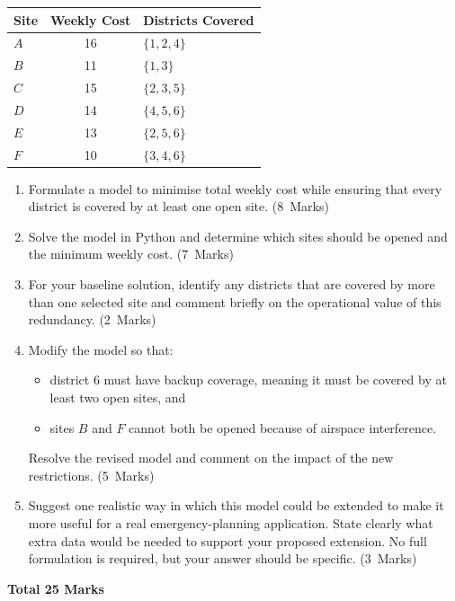 \documentclass[11pt,a4paper]{article}
\newcommand{\markalloc}[1]{\nobreak\hfill\mbox{(#1 Marks)}}
\newcommand{\questiontotal}[1]{\begin{flushright}\textbf{Total #1 Marks}\end{flushright}}
\begin{document}
\begin{center}
\begin{tabular}{lcl}
\toprule
Site & Weekly Cost & Districts Covered \\
\midrule
$A$ & 16 & $\{1,2,4\}$ \\
$B$ & 11 & $\{1,3\}$ \\
$C$ & 15 & $\{2,3,5\}$ \\
$D$ & 14 & $\{4,5,6\}$ \\
$E$ & 13 & $\{2,5,6\}$ \\
$F$ & 10 & $\{3,4,6\}$ \\
\bottomrule
\end{tabular}
\end{center}

\begin{enumerate}
\item Formulate a model to minimise total weekly cost while ensuring that every district is covered by at least one open site. \markalloc{8}

\item Solve the model in Python and determine which sites should be opened and the minimum weekly cost. \markalloc{7}

\item For your baseline solution, identify any districts that are covered by more than one selected site and comment briefly on the operational value of this redundancy. \markalloc{2}

\item Modify the model so that:
\begin{itemize}[leftmargin=0.9cm, itemsep=0.25em]
\item district 6 must have backup coverage, meaning it must be covered by at least two open sites, and
\item sites $B$ and $F$ cannot both be opened because of airspace interference.
\end{itemize}
Resolve the revised model and comment on the impact of the new restrictions. \markalloc{5}

\item Suggest one realistic way in which this model could be extended to make it more useful for a real emergency-planning application.
State clearly what extra data would be needed to support your proposed extension. No full formulation is required, but your answer should be specific. \markalloc{3}
\end{enumerate}

\questiontotal{25}
\end{document}
